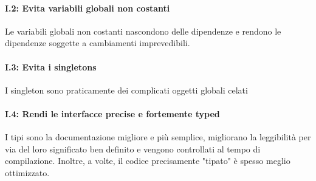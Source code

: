 \paragraph{I.2: Evita variabili globali non costanti}

\textsf{\small Le variabili globali non costanti nascondono delle dipendenze e rendono le dipendenze soggette a cambiamenti imprevedibili.} \\

\paragraph{I.3: Evita i singletons}

\textsf{\small I singleton sono praticamente dei complicati oggetti globali celati} \\ %

\paragraph{I.4: Rendi le interfacce precise e fortemente typed}

\textsf{\small I tipi sono la documentazione migliore e più semplice, migliorano la leggibilità per via del loro significato ben definito e vengono controllati al tempo di compilazione. Inoltre, a volte, il codice precisamente "tipato" è spesso meglio ottimizzato.} \\

